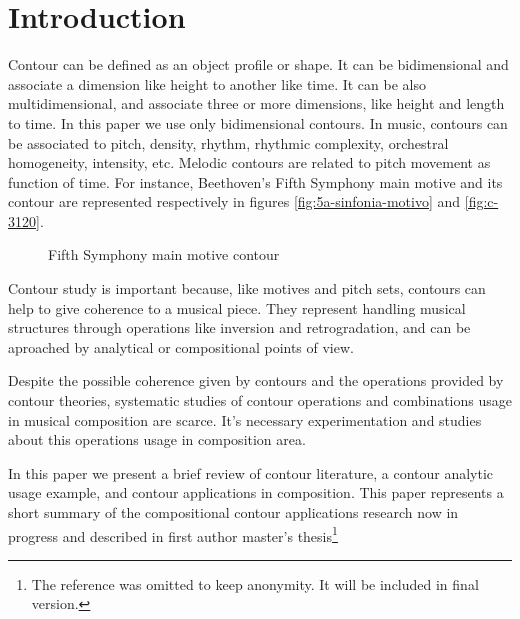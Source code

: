 

\section{Introduction}
\label{sec:introduction}

Contour can be defined as an object profile or shape. It can be
bidimensional and associate a dimension like height to another like
time. It can be also multidimensional, and associate three or more
dimensions, like height and length to time. In this paper we use only
bidimensional contours. In music, contours can be associated to pitch,
density, rhythm, rhythmic complexity, orchestral homogeneity,
intensity, etc. Melodic contours are related to pitch movement as
function of time. For instance, Beethoven's Fifth Symphony main motive
and its contour are represented respectively in figures
\ref{fig:5a-sinfonia-motivo} and \ref{fig:c-3120}.

\begin{figure}[!p]
  \centering
  \subfloat[Contour (3 1 2 0)]{
    \texttt{[image: c-3120]}
    \label{fig:c-3120}
  }
  \caption{Fifth Symphony main motive contour}
  \label{fig:5a-sinfonia}
\end{figure}

Contour study is important because, like motives and pitch sets,
contours can help to give coherence to a musical piece. They represent
handling musical structures through operations like inversion and
retrogradation, and can be aproached by analytical or compositional
points of view.

Despite the possible coherence given by contours and the operations
provided by contour theories, systematic studies of contour operations
and combinations usage in musical composition are scarce. It's
necessary experimentation and studies about this operations usage in
composition area.

In this paper we present a brief review of contour literature, a
contour analytic usage example, and contour applications in
composition. This paper represents a short summary of the
compositional contour applications research now in progress and
described in first author master's thesis\footnote{The reference was
  omitted to keep anonymity. It will be included in final version.}

